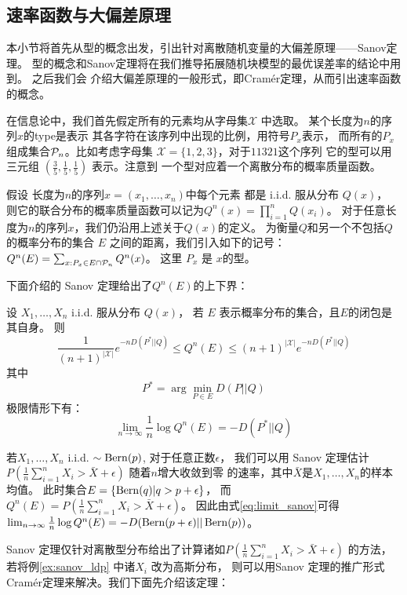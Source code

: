 \subsection{速率函数与大偏差原理}
本小节将首先从型的概念出发，引出针对离散随机变量的大偏差原理——Sanov定理。
型的概念和Sanov定理将在我们推导拓展随机块模型的最优误差率的结论中用到。
之后我们会
介绍大偏差原理的一般形式，即Cramér定理，从而引出速率函数的概念。

在信息论中，我们首先假定所有的元素均从字母集$\mathcal{X}$
中选取。
某个长度为$n$的序列$x$的\gls{type}是表示
其各字符在该序列中出现的比例，用符号$P_x$表示，
而所有的$P_x$组成集合$\P_n$。比如考虑字母集
$\mathcal{X}=\{1,2,3\}$，对于$11321$这个序列
它的型可以用三元组 $(\frac{3}{5}, 
\frac{1}{5}, \frac{1}{5})$ 表示。注意到
一个型对应着一个离散分布的概率质量函数。

假设 长度为$n$的序列$x=(x_1,\dots, x_n)$中每个元素 都是 i.i.d. 
服从分布 $Q(x)$，
则它的联合分布的概率质量函数可以记为$Q^n(x)=\prod_{i=1}^n Q(x_i)$。
对于任意长度为$n$的序列$x$，我们仍沿用上述关于$Q(x)$的定义。
为衡量$Q$和另一个不包括$Q$的概率分布的集合 $E$ 之间的距离，我们引入如下的记号：
$Q^n(E) = \sum_{x: P_x \in E \cap \P_n} Q^n(x)$。
这里 $P_x$ 是 $x$的型。

下面介绍的 Sanov 定理给出了$Q^n(E)$的上下界：
\begin{theorem}
  设 $X_1, \dots, X_n$ i.i.d. 服从分布 $Q(x)$，
  若 $E$ 表示概率分布的集合，且$E$的闭包是其自身。
  则
  \begin{equation}
  \frac{1}{(n+1)^{|\mathcal{X}|}} e^{-n D(P^*||Q)}
  \leq Q^n(E) \leq (n+1)^{|\mathcal{X}|} e^{-n D(P^*||Q)}
  \end{equation}
  其中
  \begin{equation}
    P^* = \arg\min_{P\in E} D(P||Q)
  \end{equation}
  极限情形下有：
  \begin{equation}\label{eq:limit_sanov}
    \lim_{n\to \infty} \frac{1}{n} \log Q^n(E) = -D(P^*||Q)
  \end{equation}
\end{theorem}
\begin{example}\label{ex:sanov_ldp}
若$X_1, \dots, X_n$ i.i.d. $\sim \Bern(p)$,
对于任意正数$\epsilon$，
我们可以用 Sanov 定理估计 $P(\frac{1}{n} \sum_{i=1}^n X_i > \bar{X} + \epsilon)$ 随着$n$增大收敛到零
的速率，其中$\bar{X}$是$X_1,\dots, X_n$的样本均值。
此时集合$E=\{\Bern(q)| q>p+\epsilon\}$，
而$Q^n(E)=P(\frac{1}{n} \sum_{i=1}^n X_i > \bar{X} + \epsilon)$。
因此由式\eqref{eq:limit_sanov}可得
$\lim_{n\to \infty} \frac{1}{n} \log Q^n(E)=-D(\Bern(p+\epsilon)||\Bern(p))$。
\end{example}
Sanov 定理仅针对离散型分布给出了计算诸如$P(\frac{1}{n} \sum_{i=1}^n X_i > \bar{X} + \epsilon)$
的方法，若将例\ref{ex:sanov_ldp} 中诸$X_i$ 改为高斯分布，
则可以用Sanov 定理的推广形式 Cramér定理来解决。我们下面先介绍该定理：

